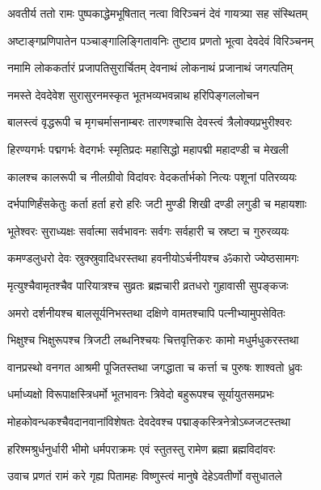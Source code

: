 \twolineshloka
{अवतीर्य ततो रामः पुष्पकाद्धेमभूषितात्}
{नत्वा विरिञ्चनं देवं गायत्र्या सह संस्थितम्}%

\twolineshloka
{अष्टाङ्गप्रणिपातेन पञ्चाङ्गालिङ्गितावनिः}
{तुष्टाव प्रणतो भूत्वा देवदेवं विरिञ्चनम्}%


\twolineshloka
{नमामि लोककर्तारं प्रजापतिसुरार्चितम्}
{देवनाथं लोकनाथं प्रजानाथं जगत्पतिम्}%

\twolineshloka
{नमस्ते देवदेवेश सुरासुरनमस्कृत}
{भूतभव्यभवन्नाथ हरिपिङ्गललोचन}%

\twolineshloka
{बालस्त्वं वृद्धरूपी च मृगचर्मासनाम्बरः}
{तारणश्चासि देवस्त्वं त्रैलोक्यप्रभुरीश्वरः}%

\twolineshloka
{हिरण्यगर्भः पद्मगर्भः वेदगर्भः स्मृतिप्रदः}
{महासिद्धो महापद्मी महादण्डी च मेखली}%

\twolineshloka
{कालश्च कालरूपी च नीलग्रीवो विदांवरः}
{वेदकर्तार्भको नित्यः पशूनां पतिरव्ययः}%

\twolineshloka
{दर्भपाणिर्हंसकेतुः कर्ता हर्ता हरो हरिः}
{जटी मुण्डी शिखी दण्डी लगुडी च महायशाः}%

\twolineshloka
{भूतेश्वरः सुराध्यक्षः सर्वात्मा सर्वभावनः}
{सर्वगः सर्वहारी च स्रष्टा च गुरुरव्ययः}%

\twolineshloka
{कमण्डलुधरो देवः स्रुक्स्रुवादिधरस्तथा}
{हवनीयोऽर्चनीयश्च ॐकारो ज्येष्ठसामगः}%

\twolineshloka
{मृत्युश्चैवामृतश्चैव पारियात्रश्च सुव्रतः}
{ब्रह्मचारी व्रतधरो गुहावासी सुपङ्कजः}%

\twolineshloka
{अमरो दर्शनीयश्च बालसूर्यनिभस्तथा}
{दक्षिणे वामतश्चापि पत्नीभ्यामुपसेवितः}%

\twolineshloka
{भिक्षुश्च भिक्षुरूपश्च त्रिजटी लब्धनिश्चयः}
{चित्तवृत्तिकरः कामो मधुर्मधुकरस्तथा}%

\twolineshloka
{वानप्रस्थो वनगत आश्रमी पूजितस्तथा}
{जगद्धाता च कर्त्ता च पुरुषः शाश्वतो ध्रुवः}%

\twolineshloka
{धर्माध्यक्षो विरूपाक्षस्त्रिधर्मो भूतभावनः}
{त्रिवेदो बहुरूपश्च सूर्यायुतसमप्रभः}%

\twolineshloka
{मोहकोवन्धकश्चैवदानवानांविशेषतः}
{देवदेवश्च पद्माङ्कस्त्रिनेत्रोऽब्जजटस्तथा}%

\twolineshloka
{हरिश्मश्रुर्धनुर्धारी भीमो धर्मपराक्रमः}
{एवं स्तुतस्तु रामेण ब्रह्मा ब्रह्मविदांवरः}%

\twolineshloka
{उवाच प्रणतं रामं करे गृह्य पितामहः}
{विष्णुस्त्वं मानुषे देहेऽवतीर्णो वसुधातले}%

